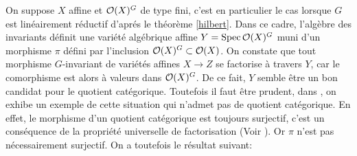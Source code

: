 On suppose $X$ affine et $\mathcal{O}(X)^G$ de type fini, c'est en particulier le cas lorsque $G$ est linéairement réductif d'aprés le théorème \ref{hilbert}. Dans ce cadre, l'algèbre des invariants définit une variété algébrique affine $Y=\operatorname{Spec} \mathcal{O}(X)^G$ muni d'un morphisme $\pi$ défini par l'inclusion $\mathcal{O}(X)^G\subset \mathcal{O}(X)$. On constate que tout morphisme $G$-invariant de variétés affines $X\rightarrow Z$ se factorise à travers $Y$, car le comorphisme est alors à valeurs dans $\mathcal{O}(X)^G$. De ce fait, $Y$ semble être un bon candidat pour le quotient catégorique. Toutefois il faut être prudent, dans \cite[6.4.10]{LAGFerrer}, on exhibe un exemple de cette situation qui n'admet pas de quotient catégorique. En effet, le morphisme d'un quotient catégorique est toujours surjectif, c'est un conséquence de la propriété universelle de factorisation (Voir  \cite[6.4.5]{LAGFerrer}). Or $\pi$ n'est pas nécessairement surjectif. On a toutefois le résultat suivant:

